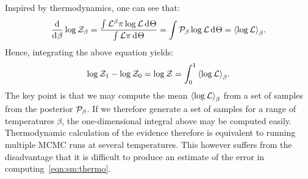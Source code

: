 Inspired by thermodynamics, one can see that:
\begin{equation}
  \frac{\operatorname{d}^{}\!{}}{\operatorname{d}^{}\!{\beta}}\log\mathcal{Z}_\beta = \frac{\int  \mathcal{L}^\beta \pi \log\mathcal{L}\operatorname{d}^{}\!{\Theta}}{\int\mathcal{L}\pi \operatorname{d}^{}\!{\Theta}} = \int \mathcal{P}_\beta \log\mathcal{L}\operatorname{d}^{}\!{\Theta} =  {\left\langle{\log\mathcal{L}}\right\rangle}_\beta.
  \label{eqn:bay:thermo}
\end{equation}
Hence, integrating the above equation yields:
\begin{equation}
  \log\mathcal{Z}_1-\log\mathcal{Z}_0 = \log\mathcal{Z} = \int_{0}^{1}{\left\langle{\log\mathcal{L}}\right\rangle}_\beta.
  \label{eqn:sm:thermo}
\end{equation}
The key point is that we may compute the mean ${\left\langle{\log\mathcal{L}}\right\rangle}_\beta$ from a set of samples from the posterior $\mathcal{P}_\beta$. If we therefore generate a set of samples for a range of temperatures $\beta$, the one-dimensional integral above may be computed easily. Thermodynamic calculation of the evidence therefore is equivalent to running multiple MCMC runs at several temperatures.
This however suffers from the disadvantage that it is difficult to produce an estimate of the error in computing~\eqref{eqn:sm:thermo}. 

